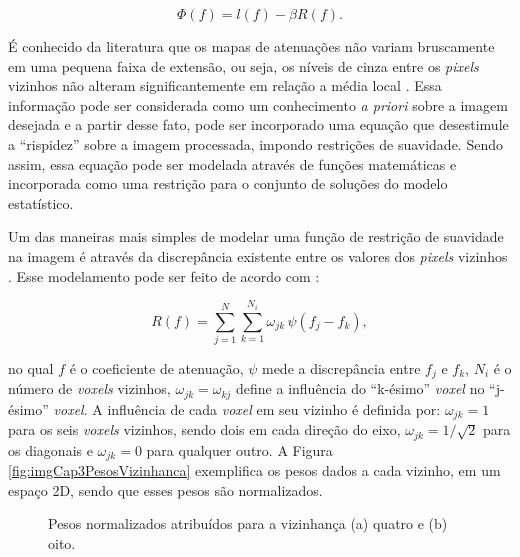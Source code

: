 {{\begin{equation}
\Phi(f) = l(f) - \beta R(f).
\label{eq:eqCap3TeoremaBayesLogSimplificadaFinal}
\end{equation}

É conhecido da literatura que os mapas de atenuações não variam bruscamente em uma pequena faixa de extensão, ou seja, os níveis de cinza entre os \textit{pixels} vizinhos não alteram significantemente em relação a média local \cite{Fessler2000handbook,buzug2008computed}. Essa informação pode ser considerada como um conhecimento \textit{a priori} sobre a imagem desejada e a partir desse fato, pode ser incorporado uma equação que desestimule a ``rispidez'' sobre a imagem processada, impondo restrições de suavidade. Sendo assim, essa equação pode ser modelada através de funções matemáticas e incorporada como uma restrição para o conjunto de soluções do modelo estatístico.

Um das maneiras mais simples de modelar uma função de restrição de suavidade na imagem é através da discrepância existente entre os valores dos \textit{pixels} vizinhos \cite[p. 12]{Fessler2000handbook}. Esse modelamento pode ser feito de acordo com :

\begin{equation}
R(f) = \sum_{j=1}^{N}  \sum_{k=1}^{N_{i}} \omega_{jk} \, \psi(f_{j}-f_{k}),
\label{eq:eqCap3DiscrepanciaPixels}
\end{equation}  

\noindent no qual $f$ é o coeficiente de atenuação, $\psi$ mede a discrepância entre $f_{j}$ e $f_{k}$, $N_{i}$ é o número de \textit{voxels} vizinhos, $\omega_{jk} = \omega_{kj}$ define a influência do ``k-ésimo'' \textit{voxel} no ``j-ésimo'' \textit{voxel}. A influência de cada \textit{voxel} em seu vizinho é definida por: $\omega_{jk} = 1$ para os seis \textit{voxels} vizinhos, sendo dois em cada direção do eixo, $\omega_{jk} = 1/\sqrt{2}$ para os diagonais e $\omega_{jk} = 0$ para qualquer outro. A Figura \ref{fig:imgCap3PesosVizinhanca} exemplifica os pesos dados a cada vizinho, em um espaço \acs{2D}, sendo que esses pesos são normalizados.


\begin{figure}[H]
	\centering
	
	\caption{Pesos normalizados atribuídos para a vizinhança (a) quatro e (b) oito.}
	
	

\end{figure}}}
